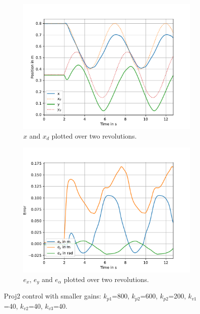 \begin{figure}[H]
    \centering
    \begin{subfigure}[t]{0.48\textwidth}
        \centering
        \includegraphics[width=\textwidth]{SRC/CircleTraj_small_kp_x_x_d.pdf} %
        \caption{$x$ and $x_d$ plotted over two revolutions.}
        \label{fig:SmallKpCircXD}
    \end{subfigure}
    \hfill
    \begin{subfigure}[t]{0.48\textwidth}
        \centering
        \includegraphics[width=\textwidth]{SRC/CircleTraj_small_kp_exeyea.pdf} %
        \caption{$e_x$, $e_y$ and $e_\alpha$ plotted over two revolutions.}
        \label{fig:SmallKpCircEX}
    \end{subfigure}
    
    \caption{Proj2 control with smaller gains: $k_{p1}$=800, $k_{p2}$=600, $k_{p2}$=200, $k_{v1}$=40, $k_{v2}$=40, $k_{v3}$=40.}
    \label{fig:SmallKpCirc}
\end{figure}

